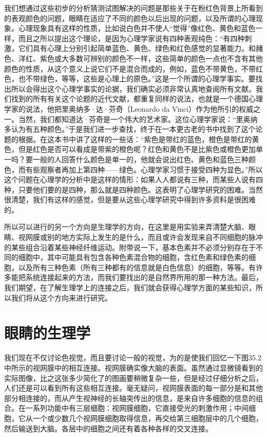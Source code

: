 我们想通过这些初步的分析猜测试图解决的问题是那些关于在粉红色背景上所看到的表观颜色的问题，眼睛在适应了不同的颜色以后出现的问题，以及所谓的心理现象。心理现象具有这样的性质，比如说白色并不使人“觉得”像红色、黄色和蓝色一样，而且之所以提出这个理论，是因为心理学家说有四种表观纯色：“有四种刺激，它们具有心理上分别引起简单蓝色、黄色、绿色和红色感觉的显著能力。和赭色、洋红、紫色或大多数可辨别的颜色不一样，这些简单的颜色一点也不含有其他颜色的性质，从这个意义上说它们不是混合而成的，例如，蓝色不带黄色，不带红色，也不带绿色，等等，这些是心理上的原色。”这是一个所谓的心理学事实。要找出所以会得出这个心理学事实的论据，我们确实必须非常认真地查阅所有文献。我们找到的所有有关这个论题的近代文献，都重复同样的说法，也就是一个德国心理学家的说法，他把里奥纳多·达·芬奇（Leonardo da Vinci）作为他所引的权威之一。当然，我们都知道达·芬奇是一个伟大的艺术家。这位心理学家说：“里奥纳多认为有五种颜色。”于是我们进一步查找，终于在一本更古老的书中找到了这个论题的根据。在这本书中讲了这样的一些话：“紫色是带红的蓝色，橙色是带红的黄色，但是红色是否可以看成是带紫的橙色呢？红色和黄色不是比紫色或橙色更加单一吗？要一般的人回答什么颜色是单一的，他就会说出红色、黄色和蓝色三种颜色，而有些观察者再加上第四种——绿色。心理学家习惯于接受四种为显色。”所以这个问题在心理学的分析中是这样的情形：如果人人都说有三种，而某些人说有四种，只要他们要的是四种，那么就是四种颜色。这表明了心理学研究的困难。当然很清楚，我们有这样的感觉，但是要从这些心理学研究中得到许多资料是很困难的。

所以可以进行的另一个方向是生理学的方向，在这里是用实验来弄清楚大脑、眼睛、视网膜或别的地方实际上发生的是什么，而且或许会发现来自不同细胞的脉冲的某些组合沿着某些神经纤维运动。附带说一下，基本色素并不必须分别存在于不同的细胞中，其中可能具有包含各种色素混合物的细胞，含红色素和绿色素的细胞，以及所有三种色素（所有三种都有的信息就是白色信息）的细胞，等等。有许多能把系统连接起来的方法，而我们要找出的是自然界所用的那一种方法。最后，我们期望，在了解生理学上的连接之后，我们就会获得心理学方面的某些知识，所以我们将从这个方向来进行研究。

\section{眼睛的生理学}

我们现在不仅讨论色视觉，而且要讨论一般的视觉，为的是使我们回忆一下图35.2中所示的视网膜中的相互连接。视网膜确实像大脑的表面。虽然通过显微镜看到的实际图像，比之这张多少简化了的图画要稍微复杂一些，但是经过仔细分析之后，人们还是可以看到所有这些相互连接。毫无疑问，视网膜表面的每一部分是和其他部分相连接的，而从产生视神经的长轴突传出的信息，是来自许多细胞的信息的组合。在一系列功能中有三层细胞：视网膜细胞，它直接受光的刺激作用；中间细胞，它从一个或少数几个视网膜细胞取得信息，再交给第三细胞层中的几个细胞，然后输送到大脑。各层中的细胞之间还有着各种各样的交叉连接。


